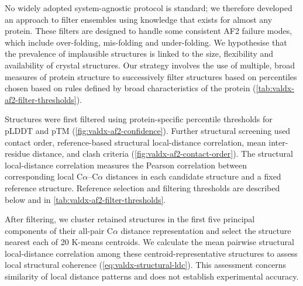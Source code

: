 No widely adopted system-agnostic protocol is standard; we therefore developed an approach to filter ensembles using knowledge that exists for almost any protein. These filters are designed to handle some consistent AF2 failure modes, which include over-folding, mis-folding and under-folding. We hypothesise that the prevalence of implausible structures is linked to the size, flexibility and availability of crystal structures. Our strategy involves the use of multiple, broad measures of protein structure to successively filter structures based on percentiles chosen based on rules defined by broad characteristics of the protein (\cref{tab:valdx-af2-filter-thresholds}).

Structures were first filtered using protein-specific percentile thresholds for pLDDT and pTM (\cref{fig:valdx-af2-confidence}). Further structural screening used contact order, reference-based structural local-distance correlation, mean inter-residue distance, and clash criteria (\cref{fig:valdx-af2-contact-order}). The structural local-distance correlation measures the Pearson correlation between corresponding local C$\alpha$--C$\alpha$ distances in each candidate structure and a fixed reference structure. Reference selection and filtering thresholds are described below and in \cref{tab:valdx-af2-filter-thresholds}.

After filtering, we cluster retained structures in the first five principal components of their all-pair C$\alpha$ distance representation and select the structure nearest each of 20 K-means centroids. We calculate the mean pairwise structural local-distance correlation among these centroid-representative structures to assess local structural coherence (\cref{eq:valdx-structural-ldc}). This assessment concerns similarity of local distance patterns and does not establish experimental accuracy.

